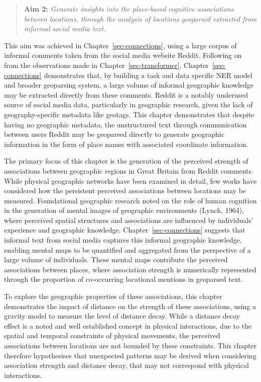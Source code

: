 \documentclass[
  letterpaper,
  11pt,
  english,
  onehalfspacing,
  headsepline]{MastersDoctoralThesis}
\begin{document}
\begin{quote}
\textbf{Aim 2:} \emph{Generate insights into the place-based cognitive
associations between locations, through the analysis of locations
geoparsed extracted from informal social media text.}
\end{quote}

This aim was achieved in Chapter~\ref{sec-connections}, using a large
corpus of informal comments taken from the social media website Reddit.
Following on from the observations made in
Chapter~\ref{sec-transformer}, Chapter~\ref{sec-connections}
demonstrates that, by building a task and data specific NER model and
broader geoparsing system, a large volume of informal geographic
knowledge may be extracted directly from these comments. Reddit is a
notably underused source of social media data, particularly in
geographic research, given the lack of geography-specific metadata like
geotags. This chapter demonstrates that despite having no geographic
metadata, the unstructured text through communication between users
Reddit may be geoparsed directly to generate geographic information in
the form of place names with associated coordinate information.

The primary focus of this chapter is the generation of the perceived
strength of associations between geographic regions in Great Britain
from Reddit comments. While physical geographic networks have been
examined in detail, few works have considered how the persistent
perceived associations between locations may be measured. Foundational
geographic research noted on the role of human cognition in the
generation of mental images of geographic environments (Lynch, 1964),
where perceived spatial structures and associations are influenced by
individuals' experience and geographic knowledge.
Chapter~\ref{sec-connections} suggests that informal text from social
media captures this informal geographic knowledge, enabling mental maps
to be quantified and aggregated from the perspective of a large volume
of individuals. These mental maps contribute the perceived associations
between places, where association strength is numerically represented
through the proportion of co-occurring locational mentions in geoparsed
text.

To explore the geographic properties of these associations, this chapter
demonstrates the impact of distance on the strength of these
associations, using a gravity model to measure the level of distance
decay. While a distance decay effect is a noted and well established
concept in physical interactions, due to the spatial and temporal
constraints of physical movements, the perceived associations between
locations are not bounded by these constraints. This chapter therefore
hypothesises that unexpected patterns may be derived when considering
association strength and distance decay, that may not correspond with
physical interactions.
\end{document}
